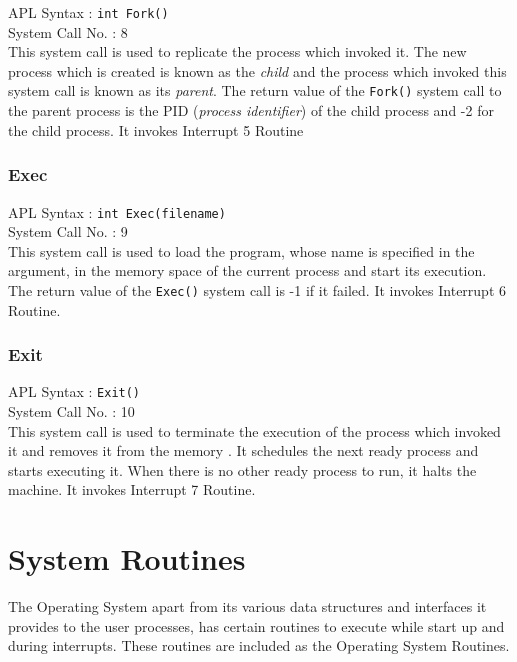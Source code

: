 \documentclass[10pt]{report}
\begin{document}
APL Syntax :  \texttt{int Fork()} \\
System Call No. : 8 \\

This system call is used to replicate the process which invoked it. The new process which is created is known as the \emph{child} and the process which invoked this system call is known as its \emph{parent}. The return value of the \texttt{Fork()} system call to the parent process is the PID (\textit{process identifier}) of the child process and -2 for the child process. It invokes Interrupt 5 Routine\\



\subsection{Exec}
\label{sec:exec()}

APL Syntax :  \texttt{int Exec(filename)} \\
System Call No. : 9 \\

This system call is used to load the program, whose name is specified in the argument, in the memory space of the current process and start its execution. The return value of the \texttt{Exec()} system call is -1 if it failed. It invokes Interrupt 6 Routine.\\


\subsection{Exit}
\label{sec:exit()}

APL Syntax :  \texttt{Exit()} \\
System Call No. : 10 \\

This system call is used to terminate the execution of the process which invoked it and removes it from the memory . It schedules the next ready process and starts executing it. When there is no other ready process to run, it halts the machine. It invokes Interrupt 7 Routine. \\



\chapter{System Routines}

\label{chp:sys routines}

The Operating System apart from its various data structures and interfaces it provides to the user processes, has certain routines to execute while start up and during interrupts. These routines are included as the Operating System Routines.
\end{document}
